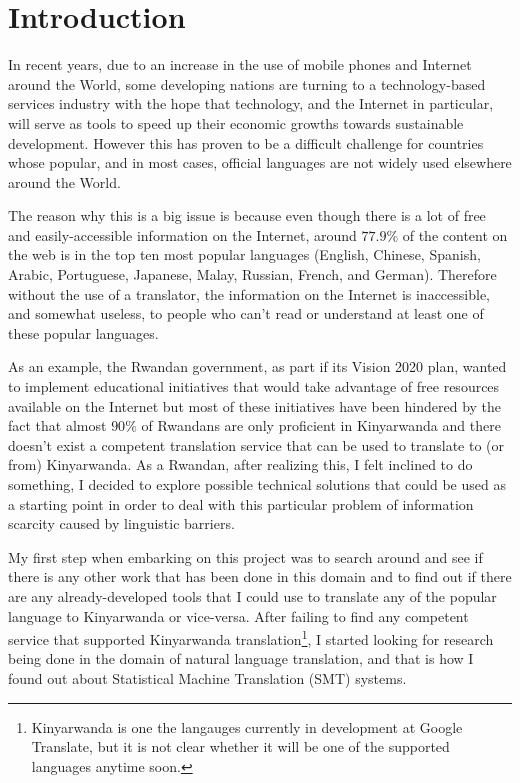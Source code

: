 \chapter{Introduction}

In recent years, due to an increase in the use of mobile phones and Internet around the World\cite[p. 131-133]{quinn1987impacts}, some developing nations are turning to a technology-based services industry with the hope that technology, and the Internet in particular, will serve as tools to speed up their economic growths towards sustainable development\cite{lall1998market}. However this has proven to be a difficult challenge for countries whose popular, and in most cases, official languages are not widely used elsewhere around the World. 

The reason why this is a big issue is because even though there is a lot of free and easily-accessible information on the Internet, around $77.9\%$ of the content on the web is in the top ten most popular languages (English, Chinese, Spanish, Arabic, Portuguese, Japanese, Malay, Russian, French, and German)\cite{internetworldstats}. Therefore without the use of a translator, the information on the Internet is inaccessible, and somewhat useless, to people who can't read or understand at least one of these popular languages. 

As an example, the Rwandan government, as part if its Vision 2020 plan, wanted to implement educational initiatives that would take advantage of free resources available on the Internet but most of these initiatives have been hindered by the fact that almost $90\%$ of Rwandans are only proficient in Kinyarwanda\cite{Samuelson2010} and there doesn't exist a competent translation service that can be used to translate to (or from) Kinyarwanda.  As a Rwandan, after realizing this, I felt inclined to do something, I decided to explore possible technical solutions that could be used as a starting point in order to deal with this particular problem of information scarcity caused by linguistic barriers.

My first step when embarking on this project was to search around and see if there is any other work that has been done in this domain and to find out if there are any already-developed tools that I could use to translate any of the popular language to Kinyarwanda or vice-versa. After failing to find any competent service that supported Kinyarwanda translation\footnote{Kinyarwanda is one the langauges currently in development at Google Translate, but it is not clear whether it will be one of the supported languages anytime soon\cite{googletranslatecommunity}.}, I started looking for research being done in the domain of natural language translation, and that is how I found out about Statistical Machine Translation (SMT) systems. 

